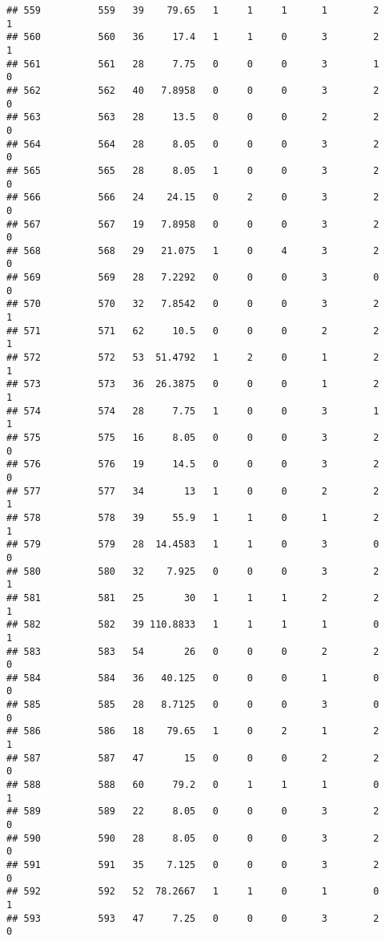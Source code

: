 \documentclass[
]{article}
\begin{document}
\begin{verbatim}
## 559          559   39    79.65   1     1     1      1        2         1
## 560          560   36     17.4   1     1     0      3        2         1
## 561          561   28     7.75   0     0     0      3        1         0
## 562          562   40   7.8958   0     0     0      3        2         0
## 563          563   28     13.5   0     0     0      2        2         0
## 564          564   28     8.05   0     0     0      3        2         0
## 565          565   28     8.05   1     0     0      3        2         0
## 566          566   24    24.15   0     2     0      3        2         0
## 567          567   19   7.8958   0     0     0      3        2         0
## 568          568   29   21.075   1     0     4      3        2         0
## 569          569   28   7.2292   0     0     0      3        0         0
## 570          570   32   7.8542   0     0     0      3        2         1
## 571          571   62     10.5   0     0     0      2        2         1
## 572          572   53  51.4792   1     2     0      1        2         1
## 573          573   36  26.3875   0     0     0      1        2         1
## 574          574   28     7.75   1     0     0      3        1         1
## 575          575   16     8.05   0     0     0      3        2         0
## 576          576   19     14.5   0     0     0      3        2         0
## 577          577   34       13   1     0     0      2        2         1
## 578          578   39     55.9   1     1     0      1        2         1
## 579          579   28  14.4583   1     1     0      3        0         0
## 580          580   32    7.925   0     0     0      3        2         1
## 581          581   25       30   1     1     1      2        2         1
## 582          582   39 110.8833   1     1     1      1        0         1
## 583          583   54       26   0     0     0      2        2         0
## 584          584   36   40.125   0     0     0      1        0         0
## 585          585   28   8.7125   0     0     0      3        0         0
## 586          586   18    79.65   1     0     2      1        2         1
## 587          587   47       15   0     0     0      2        2         0
## 588          588   60     79.2   0     1     1      1        0         1
## 589          589   22     8.05   0     0     0      3        2         0
## 590          590   28     8.05   0     0     0      3        2         0
## 591          591   35    7.125   0     0     0      3        2         0
## 592          592   52  78.2667   1     1     0      1        0         1
## 593          593   47     7.25   0     0     0      3        2         0

\end{verbatim}
\end{document}
